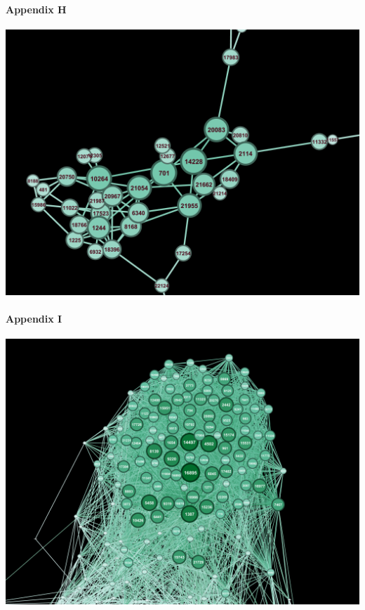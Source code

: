 \documentclass[11pt,twocolumn]{article}
\begin{document}
\paragraph{{\newline}Appendix H\newline\newline\newline\newline\newline}
\includegraphics[scale=0.22]{closennesscentraility_com.png}
\paragraph{Appendix I\newline\newline\newline\newline\newline}
\includegraphics[scale=0.22]{eigenvectorcentraility_gov.png}
\end{document}
